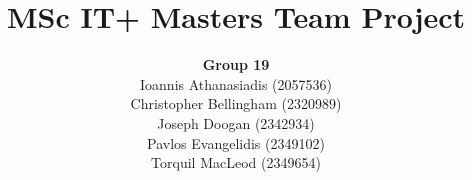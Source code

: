 \title{MSc IT+ Masters Team Project}
\author{\textbf{Group 19} \\ Ioannis Athanasiadis (2057536) \\ Christopher Bellingham (2320989) \\ Joseph Doogan (2342934) \\ Pavlos Evangelidis (2349102) \\ Torquil MacLeod (2349654)}
\date{} %